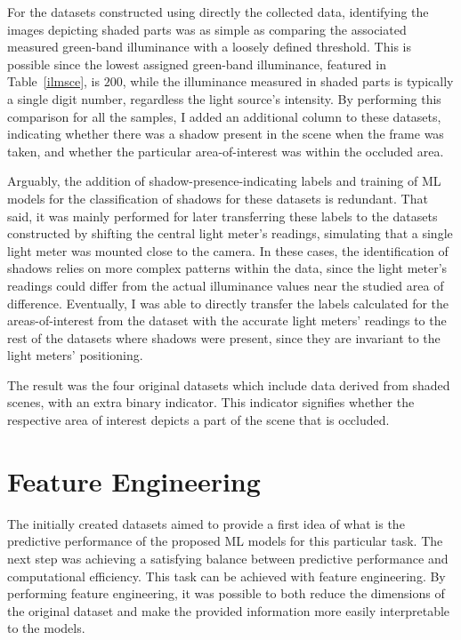 For the datasets constructed using directly the collected data, identifying the images depicting shaded parts was as simple as comparing the associated measured green-band illuminance with a loosely defined threshold. This is possible since the lowest assigned green-band illuminance, featured in Table~\ref{ilmsce}, is $200$, while the illuminance measured in shaded parts is typically a single digit number, regardless the light source's intensity. By performing this comparison for all the samples, I added an additional column to these datasets, indicating whether there was a shadow present in the scene when the frame was taken, and whether the particular area-of-interest was within the occluded area.

Arguably, the addition of shadow-presence-indicating labels and training of ML models for the classification of shadows for these datasets is redundant. That said, it was mainly performed for later transferring these labels to the datasets constructed by shifting the central light meter's readings, simulating that a single light meter was mounted close to the camera. In these cases, the identification of shadows relies on more complex patterns within the data, since the light meter's readings could differ from the actual illuminance values near the studied area of difference. Eventually, I was able to directly transfer the labels calculated for the areas-of-interest from the dataset with the accurate light meters' readings to the rest of the datasets where shadows were present, since they are invariant to the light meters' positioning.

The result was the four original datasets which include data derived from shaded scenes, with an extra binary indicator. This indicator signifies whether the respective area of interest depicts a part of the scene that is occluded.

\section{Feature Engineering}
\label{feature-eng}

The initially created datasets aimed to provide a first idea of what is the predictive performance of the proposed ML models for this particular task. The next step was achieving a satisfying balance between predictive performance and computational efficiency. This task can be achieved with feature engineering. By performing feature engineering, it was possible to both reduce the dimensions of the original dataset and make the provided information more easily interpretable to the models.

